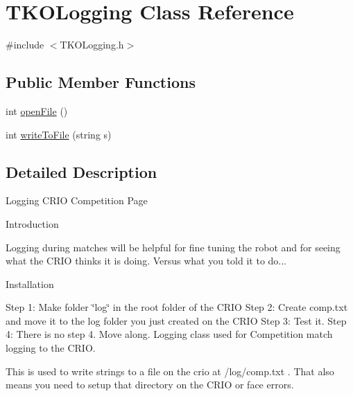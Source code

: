 \hypertarget{class_t_k_o_logging}{\section{T\-K\-O\-Logging Class Reference}
\label{class_t_k_o_logging}
}


{\ttfamily \#include $<$T\-K\-O\-Logging.\-h$>$}

\subsection*{Public Member Functions}
\begin{DoxyCompactItemize}
\item 
int \hyperlink{class_t_k_o_logging_a8061ae2e7d18973cd466789a98fb5eaf}{open\-File} ()
\item 
int \hyperlink{class_t_k_o_logging_a6c78e53cab1242c12b160f1fb1542b02}{write\-To\-File} (string s)
\end{DoxyCompactItemize}


\subsection{Detailed Description}
Logging C\-R\-I\-O Competition Page

Introduction

Logging during matches will be helpful for fine tuning the robot and for seeing what the C\-R\-I\-O thinks it is doing. Versus what you told it to do...

Installation

Step 1\-: Make folder \char`\"{}log\char`\"{} in the root folder of the C\-R\-I\-O Step 2\-: Create comp.\-txt and move it to the log folder you just created on the C\-R\-I\-O Step 3\-: Test it. Step 4\-: There is no step 4. Move along. Logging class used for Competition match logging to the C\-R\-I\-O.

This is used to write strings to a file on the crio at /log/comp.txt . That also means you need to setup that directory on the C\-R\-I\-O or face errors. 

